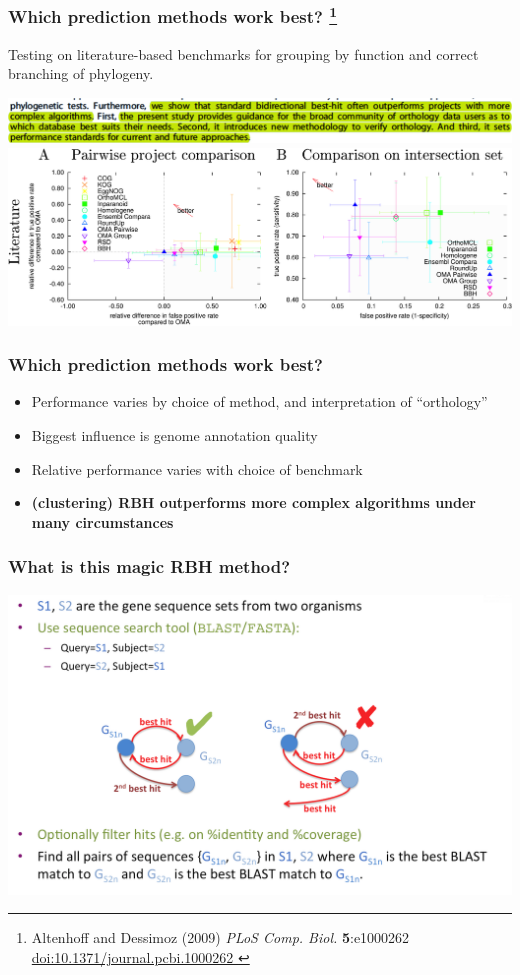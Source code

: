 \begin{frame}
  \frametitle{Which prediction methods work best?
    \footnote{\tiny{Altenhoff and Dessimoz (2009) \textit{PLoS Comp. Biol.} \textbf{5}:e1000262 \href{http://dx.doi.org/10.1371/journal.pcbi.1000262}{doi:10.1371/journal.pcbi.1000262
    }}}
  }
  Testing on literature-based benchmarks for grouping by function and correct branching of phylogeny.  \begin{center}
      \includegraphics[width=1\textwidth]{images/altenhoff1} \\
      \includegraphics[width=1\textwidth]{images/altenhoff2}      
  \end{center}
\end{frame}

\begin{frame}
  \frametitle{Which prediction methods work best?}
  \begin{itemize}
    \item Performance varies by choice of method, and interpretation of ``orthology''
    \item Biggest influence is genome annotation quality
    \item Relative performance varies with choice of benchmark
    \item \textbf{(clustering) RBH outperforms more complex algorithms under many circumstances}
  \end{itemize}
\end{frame}

\begin{frame}
  \frametitle{What is this magic RBH method?}
  \begin{center}
      \includegraphics[width=1\textwidth]{images/rbbh}      
  \end{center}
\end{frame}
